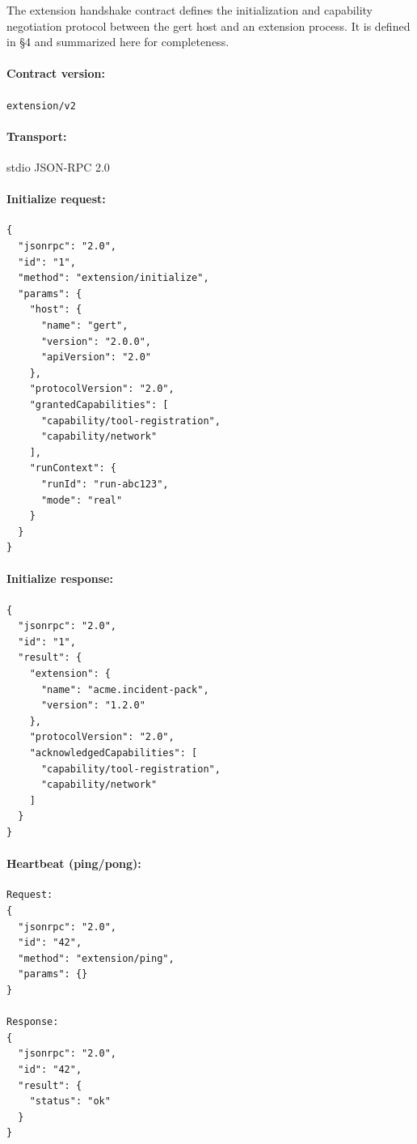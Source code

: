 The extension handshake contract defines the initialization and capability
negotiation protocol between the gert host and an extension process.  It is
defined in §4 and summarized here for completeness.

\paragraph{Contract version:} \texttt{extension/v2}

\paragraph{Transport:} stdio JSON-RPC 2.0

\paragraph{Initialize request:}

\begin{verbatim}
{
  "jsonrpc": "2.0",
  "id": "1",
  "method": "extension/initialize",
  "params": {
    "host": {
      "name": "gert",
      "version": "2.0.0",
      "apiVersion": "2.0"
    },
    "protocolVersion": "2.0",
    "grantedCapabilities": [
      "capability/tool-registration",
      "capability/network"
    ],
    "runContext": {
      "runId": "run-abc123",
      "mode": "real"
    }
  }
}
\end{verbatim}

\paragraph{Initialize response:}

\begin{verbatim}
{
  "jsonrpc": "2.0",
  "id": "1",
  "result": {
    "extension": {
      "name": "acme.incident-pack",
      "version": "1.2.0"
    },
    "protocolVersion": "2.0",
    "acknowledgedCapabilities": [
      "capability/tool-registration",
      "capability/network"
    ]
  }
}
\end{verbatim}

\paragraph{Heartbeat (ping/pong):}

\begin{verbatim}
Request:
{
  "jsonrpc": "2.0",
  "id": "42",
  "method": "extension/ping",
  "params": {}
}

Response:
{
  "jsonrpc": "2.0",
  "id": "42",
  "result": {
    "status": "ok"
  }
}
\end{verbatim}

